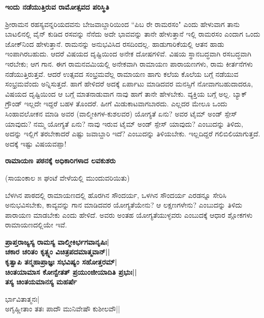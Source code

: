 {\bf ಇಂದು ನಡೆಯುತ್ತಿರುವ ರಾಮೋತ್ಸವದ ಪರಿಸ್ಥಿತಿ} 


ಶ್ರೀರಾಮನ ರಹಸ್ಯವನ್ನರಿಯದವನು ಬೇಜವಾಬ್ದಾರಿಯಿಂದ ``ಪಿಬ ರೇ ರಾಮರಸಂ" ಎಂದು ಹೇಳುವಾಗ ತಾನು ಬಾಟಲಿನಲ್ಲಿ ವೈನ್‍ ಕುಡಿದ ರಸವನ್ನು ನೆನೆದು ಅದೇ ಭಾವವನ್ನು ತಾನೇ ಹೇಳುತ್ತಾನೆ ಇಲ್ಲಿ ರಾಮರಸಂ ಎಂದಾಗ ಒಂದು ಜೋಕ್‍ನಿಂದ ಹೇಳುತ್ತಾನೆ. ರಾಮನನ್ನು ಅನುಭವಿಸಿದ ರಸದಿಂದಲ್ಲ. ಹಾಡುಗಾರಿಕೆಯಲ್ಲಿ ಆತನ ಹಾಡು ಇಂಪಾಗಿರಬಹುದು. ಆದರೆ ವಿಷಯದ ದೃಷ್ಟಿಯಿಂದ ಅನೇಕ ದೋಷಗಳಿವೆ. ವಿಷಯ ಸ್ಥಾನಬದ್ಧವಾಗಿ ರಸಬದ್ಧವಾಗಿ ಇರಬೇಕು; ಆಗ ಗಾನ. ಈಗ ರಾಮನವಮಿಯಲ್ಲಿ ಅನೇಕವಾಗಿ ರಾಮಾಯಣ ಪಾರಾಯಣಗಳು, ರಾಮ ಕೀರ್ತನೆಗಳು ನಡೆಯುತ್ತಿರುತ್ತವೆ. ಆದರೆ ಉತ್ಸವದ ಸಂಭ್ರಮವೆಲ್ಲ ರಾಮಾಯಣ ಹಾಗು ಕಲೆಯ ಕೊಲೆಯ ಬಗ್ಗೆ ನಡೆಯುವ ಸಂಭ್ರಮವೆಂದು ಅನ್ನಿಸುತ್ತದೆ. ಹಾಗೆ ಹೇಳಿದರೆ ಅದಕ್ಕೆ ಏರ್ಪಾಟು ಮಾಡಿದವರ ಮನಸ್ಸಿಗೆ ನೋವಾಗಬಹುದಾದರೂ, ವಿಷಯದ ದೃಷ್ಟಿಯಿಂದ ಆ ಬಗ್ಗೆ ಮಾತನಾಡುವಾಗ ನಾವು ಹಾಗೆ ತಾನೇ ಹೇಳಬೇಕು. ವ್ಯಕ್ತಿಯ ಬಗ್ಗೆ ಅಲ್ಲ. ಬ್ಯಾಕ್‍ ಗ್ರೌಂಡ್‍ ಇಲ್ಲದೇ ಇದ್ದರೆ ಬಹಳ ತೊಂದರೆ. ಹೀಗೆ ಮಿಡುಕಾಟವಾಗಬಾರದು. ಎಲ್ಲದರ ಮೇಲೂ ಒಂದು ಸಿಂಹಾವಲೋಕನ ಮಾಡಿ ಅವರ (ವಾಲ್ಮೀಕಿಗಳ-ಕುಶಲವರ) ಯೋಗ್ಯತೆ ಏನು? ಅವರ ಟೈಮ್‍ ಅಂಡ್‍ ಸ್ಪೇಸ್‍ ಯಾವುದು? ನಮ್ಮ ಯೋಗ್ಯತೆ ಏನು? ನಾವು ಇರುವ ಟೈಮ್‍ ಅಂಡ್‍ ಸ್ಪೇಸ್‍ ಯಾವುದು? ಎಂಬುದನ್ನು ತಿಳಿದು, ಅದನ್ನು ಇಲ್ಲಿಗೆ ತರಬೇಕಾದರೆ ಎಷ್ಟು ಜವಾಬ್ದಾರಿ ಇದೆ? ಎಂಬುದನ್ನು ತಿಳಿಯಬೇಕು. ಇಲ್ಲದಿದ್ದರೆ ಗಲಿಬಿಲಿಯಾಗುತ್ತದೆ. ಅದಕ್ಕೆ ಇಷ್ಟು ವಿಷಯವಪ್ಪಾ! 


{\bf ರಾಮಾಯಣ ಪಠನಕ್ಕೆ ಅಧಿಕಾರಿಗಳಾದ ಲವಕುಶರು} 


\begin{center} 

(ಸಾಯಂಕಾಲ ೫ ಘಂಟೆ ವೇಳೆಯಲ್ಲಿ ಮುಂದುವರಿಯಿತು) 

\end{center} 


ಬೆಳಗಿನ ಪಾಠದಲ್ಲಿ ರಾಮಾಯಣದಲ್ಲಿ ಹೊರಗಿನ ಸೌಂದರ್ಯ, ಒಳಗಿನ ಸೌಂದರ್ಯ ಎರಡನ್ನೂ ಸೇರಿಸಿ ಅನುಭವಿಸಬೇಕು, ಕಾವ್ಯವನ್ನು ಗಾನ ಮಾಡಿದವರ ಯೋಗ್ಯತೆಯೇನು? ಆ ಲಕ್ಷಣಗಳೇನು? ಎಂಬುದನ್ನು ತಿಳಿದು ಪಾರಾಯಣ ಮಾಡಬೇಕು ಎಂದು ಹೇಳಿದೆ. ಅವರು ಅಂತಹ ಯೋಗ್ಯತೆಯುಳ್ಳವರು ಎಂಬುದಕ್ಕೆ ಆಧಾರ ಶ್ಲೋಕಗಳು ರಾಮಾಯಣದಲ್ಲಿಯೇ ಇವೆ. 


\begin{center} 

{\bf ಪ್ರಾಪ್ತರಾಜ್ಯಸ್ಯ ರಾಮಸ್ಯ ವಾಲ್ಮೀಕಿರ್ಭಗವಾನೃಷಿಃ|\\ 

ಚಕಾರ ಚರಿತಂ ಕೃತ್ಸ್ನಂ ವಿಚಿತ್ರಪದಮಾತ್ಮವಾನ್‍||\\ 

ಕೃತ್ವಾಪಿ ತನ್ಮಹಾಪ್ರಾಜ್ಞಃ ಸಭವಿಷ್ಯಂ ಸಹೋತ್ತರಮ್‍|\\ 

ಚಿಂತಯಾಮಾಸ ಕೋನ್ವೇತತ್‍ ಪ್ರಯುಂಜೀಯಾದಿತಿ ಪ್ರಭುಃ||\\ 

ತಸ್ಯ ಚಿಂತಯಮಾನಸ್ಯ ಮಹರ್ಷೆ

ರ್ಭಾವಿತಾತ್ಮನಃ|\\ 

ಅಗೃಹ್ಣೀತಾಂ ತತಃ ಪಾದೌ ಮುನಿವೇಷೌ ಕುಶೀಲವೌ||} 

\end{center} 


